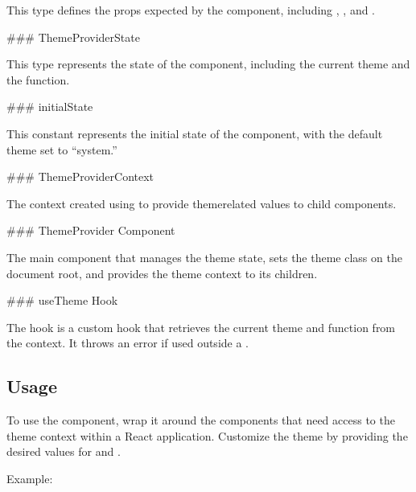 \documentclass[letterpaper,10pt,english]{sphinxmanual}
\begin{document}
\sphinxAtStartPar
This type defines the props expected by the  component, including , , and .

\sphinxAtStartPar
\#\#\# ThemeProviderState

\sphinxAtStartPar
This type represents the state of the  component, including the current theme and the  function.

\sphinxAtStartPar
\#\#\# initialState

\sphinxAtStartPar
This constant represents the initial state of the  component, with the default theme set to “system.”

\sphinxAtStartPar
\#\#\# ThemeProviderContext

\sphinxAtStartPar
The context created using  to provide theme\sphinxhyphen{}related values to child components.

\sphinxAtStartPar
\#\#\# ThemeProvider Component

\sphinxAtStartPar
The main  component that manages the theme state, sets the theme class on the document root, and provides the theme context to its children.

\sphinxAtStartPar
\#\#\# useTheme Hook

\sphinxAtStartPar
The  hook is a custom hook that retrieves the current theme and  function from the context. It throws an error if used outside a .


\subsection{Usage}
\label{\detokenize{forms/theme:usage}}
\sphinxAtStartPar
To use the  component, wrap it around the components that need access to the theme context within a React application. Customize the theme by providing the desired values for  and .

\sphinxAtStartPar
Example:
\end{document}
